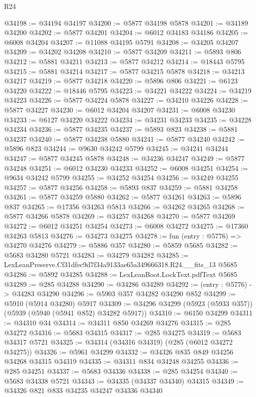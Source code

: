 \begin{lexlean}{R24}
\begin{coremodule}
@34198 := @34194 @34197
@34200 := @5877 @34198 @5878
@34201 := @34189 @34200
@34202 := @5877 @34201
@34204 := @6012 @34183 @34186
@34205 := @6008 @34204
@34207 := @11088 @34195 @5791
@34208 := @34205 @34207
@34209 := @34202 @34208
@34210 := @5877 @34209
@34211 := @5893 @806
@34212 := @5881 @34211
@34213 := @5877 @34212
@34214 := @18443 @5795
@34215 := @5881 @34214
@34217 := @5877 @34215 @5878
@34218 := @34213 @34217
@34219 := @5877 @34218
@34220 := @5896 @806
@34221 := @6123 @34220
@34222 := @18446 @5795
@34223 := @34221 @34222
@34224 := @34219 @34223
@34226 := @5877 @34224 @5878
@34227 := @34210 @34226
@34228 := @5877 @34227
@34230 := @6012 @34204 @34207
@34231 := @6008 @34230
@34233 := @6127 @34220 @34222
@34234 := @34231 @34233
@34235 := @34228 @34234
@34236 := @5877 @34235
@34237 := @5893 @823
@34238 := @5881 @34237
@34240 := @5877 @34238 @5880
@34241 := @5877 @34240
@34242 := @5896 @823
@34244 := @9630 @34242 @5799
@34245 := @34241 @34244
@34247 := @5877 @34245 @5878
@34248 := @34236 @34247
@34249 := @5877 @34248
@34251 := @6012 @34230 @34233
@34252 := @6008 @34251
@34254 := @9634 @34242 @5799
@34255 := @34252 @34254
@34256 := @34249 @34255
@34257 := @5877 @34256
@34258 := @5893 @837
@34259 := @5881 @34258
@34261 := @5877 @34259 @5880
@34262 := @5877 @34261
@34263 := @5896 @837
@34265 := @17356 @34263 @5813
@34266 := @34262 @34265
@34268 := @5877 @34266 @5878
@34269 := @34257 @34268
@34270 := @5877 @34269
@34272 := @6012 @34251 @34254
@34273 := @6008 @34272
@34275 := @17360 @34263 @5813
@34276 := @34273 @34275
@34278 := fun (entry : @5776) => @34270 @34276
@34279 := @5886 @357
@34280 := @5859 @5685
@34282 := @5683 @34280 @5721
@34283 := @34279 @34282
@34285 := LexLeanPreserve.Cf31dfec9d7f34a9133ae65a349666318.R24.__fits_13 @5685
@34286 := @5892 @34285
@34288 := LexLeanBoot.LockText.pdfText @5685
@34289 := @285 @34288
@34290 := @34286 @34289
@34292 := (entry : @5776) -> @34283 @34290
@34296 := @5903 @357 @34282 @34290 @852
@34299 := @5910 (@5914 @34280) @5917
@34309 := @34296 @34299 (@5923 (@5933 @357)) (@5939 (@5940 (@5941 @852) @34282 @5917))
@34310 := @6150 @34299
@34311 := @34310 @34
@34314 := @34311 @850 @34269 @34276
@34315 := @285 @34272
@34316 := @5683 @34315
@34317 := @285 @34275
@34319 := @5683 @34317 @5721
@34325 := @34314 (@34316 @34319) (@285 (@6012 @34272 @34275))
@34326 := @5961 @34299
@34332 := @34326 @835 @849 @34256 @34268 @34315 @34319
@34335 := @34311 @834 @34248 @34255
@34336 := @285 @34251
@34337 := @5683 @34336
@34338 := @285 @34254
@34340 := @5683 @34338 @5721
@34343 := @34335 (@34337 @34340) @34315
@34349 := @34326 @821 @833 @34235 @34247 @34336 @34340

\end{coremodule}
\end{lexlean}
